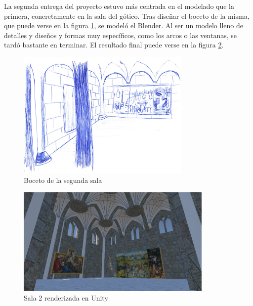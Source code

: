 La segunda entrega del proyecto estuvo más centrada en el modelado que la primera, concretamente en la sala del gótico. Tras diseñar el boceto de la misma, que puede verse en la figura \ref{fig:bocetos-sala-2}, se modeló el Blender. Al ser un modelo lleno de detalles y diseños y formas muy específicos, como los arcos o las ventanas, se tardó bastante en terminar. El resultado final puede verse en la figura \ref{fig:unity-sala-2}.

\begin{figure}[!h]
\begin{center}
\includegraphics[width=0.75\textwidth]{imagenes/7/bocetos/boceto-sala-2.png}
\caption{Boceto de la segunda sala}
\label{fig:bocetos-sala-2}
\end{center}
\end{figure}

\begin{figure}[!h]
\begin{center}
\includegraphics[width=0.85\textwidth]{imagenes/7/salas-unity/unity-sala-2.png}
\caption{Sala 2 renderizada en Unity}
\label{fig:unity-sala-2}
\end{center}
\end{figure}

